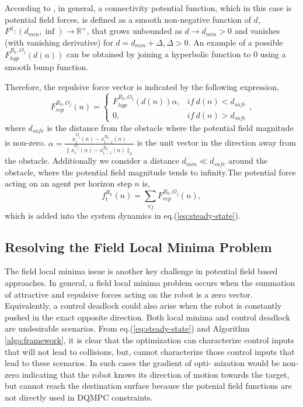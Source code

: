 \documentclass[12pt]{article}
\begin{document}
According to \cite{secchi2013bilateral}, in general, a connectivity potential function, which in this case is potential field forces, is defined as a smooth non-negative function of $d$, $F^{d}:(d_{min},\inf)\rightarrow \mathbb{R}^{+}$, that grows unbounded as $d\rightarrow d_{min}>0$ and vanishes (with vanishing derivative) for $d=d_{min}+\Delta,\Delta>0$. An example of a possible $F_{hyp}^{R_{k},O_{j}}(d(n))$ can be obtained by joining a hyperbolic function to 0 using a smooth bump function.

Therefore, the repulsive force vector is indicated by the following expression,
\begin{equation}
F_{rep}^{R_{k},O_{j}}(n)=
\left\{
\begin{array}{lr}
F_{hyp}^{R_{k},O_{j}}(d(n))\alpha, & if\ d(n)<d_{safe}\\
0, & if\ d(n)>d_{safe}
\end{array}
\right.
,
\end{equation}
where $d_{safe}$ is the distance from the obstacle where the potential field magnitude is non-zero. $\alpha=\frac{x_{t}^{O_{j}}(n)-x_{t-1}^{R_{k}}(n)}{\lVert x_{t}^{O_{j}}(n)-x_{t-1}^{R_{k}}(n) \rVert_{2}}$ is the unit vector in the direction away from the obstacle. Additionally we consider a distance $d_{min}\ll d_{safe}$ around the obstacle, where the potential field magnitude tends to infinity.The potential force acting on an agent per horizon step $n$ is,
\begin{equation}
f_{t}^{R_{k}}(n)=\sum_{\forall j}F_{rep}^{R_{k},O_{j}}(n), 
\end{equation}
which is added into the system dynamics in eq.(\ref{eq:steady-state}).

\subsection{Resolving the Field Local Minima Problem}
\label{sec:fieldlocalminima}
The field local minima issue is another key challenge in potential field based approaches. In general, a field local minima problem occurs when the summation of attractive and repulsive forces acting on the robot is a zero vector. Equivalently, a control deadlock could also arise when the robot is constantly pushed in the exact opposite direction. Both local minima and control deadlock are undesirable scenarios. From eq.(\ref{eq:steady-state}) and Algorithm \ref{algo:framework}, it is clear that the optimization can characterize control inputs that will not lead to collisions, but, cannot characterize those control inputs that lead to these scenarios. In such cases the gradient of opti- mization would be non-zero indicating that the robot knows its direction of motion towards the target, but cannot reach the destination surface because the potenial field functions are not directly used in DQMPC constraints.
\end{document}
